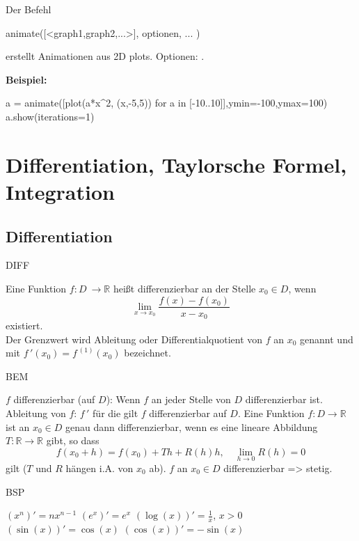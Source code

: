 \documentclass[fontsize=12pt,paper=a4,twoside,bibtotoc,idxtotoc,
liststotoc,pagesize,BCOR1.2cm,DIV15,chapterprefix,pagesize=pdftex]{scrbook}
\theoremstyle{plain}
\theoremstyle{definition}
\theoremstyle{remark}
\begin{document}
Der Befehl 
\begin{sagein}
animate([<graph1,graph2,...>], optionen, ... ) 
\end{sagein}
erstellt Animationen aus 2D plots. Optionen: .

\textbf{Beispiel:}
\begin{sagein}
a = animate([plot(a*x^2, (x,-5,5)) for a in [-10..10]],ymin=-100,ymax=100)
a.show(iterations=1)
\end{sagein}
\begin{center}
\end{center}

\chapter{Differentiation, Taylorsche Formel, Integration}
\section{Differentiation}

DIFF

Eine Funktion $f: D \ \rightarrow \mathbb{R}$ heißt {\color{red}  differenzierbar} an
der Stelle $x_0 \in D$, wenn 
\[ \lim_{x \rightarrow x_0} \frac{f(x)-f(x_0)}{x -x_0} \]
existiert. \\
Der Grenzwert wird {\color{red} Ableitung} oder {\color{red} Differentialquotient}
von $f$ an $x_0$ genannt und mit $f\,'(x_0)=f^{\,(1)} (x_0)$ bezeichnet.

BEM


 $f$ {\color{red} differenzierbar} (auf $D$): Wenn $f$ an jeder
Stelle von $D$ differenzierbar ist. 
 {\color{red} Ableitung} von $f$: $f\,'$ für die gilt $f$ differenzierbar auf $D$.
 Eine Funktion $f:D \rightarrow \mathbb{R}$ ist an $x_0 \in D$
genau dann differenzierbar, wenn es eine lineare Abbildung
$T:\mathbb{R} \rightarrow \mathbb{R}$ gibt, so dass 
\[ f(x_0+h)=f(x_0) +Th + R(h)h, \quad \lim_{h \rightarrow 0} R(h)=0 \]
gilt ($T$ und $R$ hängen i.A. von $x_0$ ab). 
 $f$ an $x_0 \in D$ differenzierbar => stetig.


BSP


 $(x^n)'=n x^{n-1}$
 $(e^x)'=e^x$
 $(\log(x))'= \frac{1}{x}$, $x>0$
 $(\sin(x))'=\cos(x)$
 $(\cos(x))'=-\sin(x)$
\end{document}
